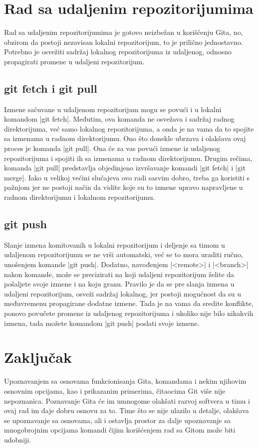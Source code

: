 \documentclass[a4paper]{article}
\begin{document}
{\section{Rad sa udaljenim repozitorijumima}
\label{sec:udaljeni_repozitorijumi}
Rad sa udaljenim repozitorijumima je gotovo neizbežan u korišćenju Gita, no, obzirom da postoji nezavisan lokalni repozitorijum, to je prilično jednostavno. Potrebno je osvežiti sadržaj lokalnog repozitorijuma iz udaljenog, odnosno propagirati promene u udaljeni repozitorijum.


\subsection{git fetch i git pull}
\label{subsec:git_pull}
Izmene sačuvane u udaljenom repozitorijum mogu se povući i u lokalni komandom |git fetch|. Međutim, ova komanda ne osvežava i sadržaj radnog direktorijuma, već samo lokalnog repozitorijuma, a onda je na vama da to spojite sa izmenama u radnom direktorijumu. Ono što donekle ubrzava i olakšava ovaj proces je komanda |git pull|. Ona će za vas povući izmene iz udaljenog repozitorijuma i spojiti ih sa izmenama u radnom direktorijumu. Drugim rečima, komanda |git pull| predstavlja objedinjeno izvršavanje komandi |git fetch| i |git merge|. Iako u velikoj većini slučajeva ovo radi sasvim dobro, treba ga koristiti s pažnjom jer ne postoji način da vidite koje su to izmene upravo napravljene u radnom direktorijumu i lokalnom repozitorijumu.




\subsection{git push}
\label{subsec:git_push}
Slanje izmena komitovanih u lokalni repozitorijum i deljenje sa timom u udaljenom repozitorijumu se ne vrši automatski, već se to mora uraditi ručno, unošenjem komande |git push|. Dodatno, navođenjem |<remote>| i |<branch>| nakon komande, može se precizirati na koji udaljeni repozitorijum želite da pošaljete svoje izmene i na koju granu. Pravilo je da se pre slanja izmena u udaljeni repozitorijum, osveži sadržaj lokalnog, jer postoji mogućnost da su u međuvremenu propagirane dodatne izmene. Tada je na vama da sredite konflikte, ponovo povučete promene iz udaljenog repozitorijuma i ukoliko nije bilo nikakvih izmena, tada možete komandom |git push| poslati svoje izmene.



\section{Zaključak}
\label{sec:zakljucak}
Upoznavanjem sa osnovama funkcionisanja Gita, komandama i nekim njihovim osnovnim opcijama, kao i prikazanim primerima, čitaocima Git više nije nepoznanica. Poznavanje Gita će im umnogome olakšati razvoj softvera u timu i ovaj rad im daje dobru osnovu za to. Time što se nije ulazilo u detalje, olakšava se upoznavanje sa osnovama, ali i ostavlja prostor za dalje upoznavanje sa mnogobrojnim opcijama komandi čijim korišćenjem rad sa Gitom može biti udobniji.

}
\end{document}
